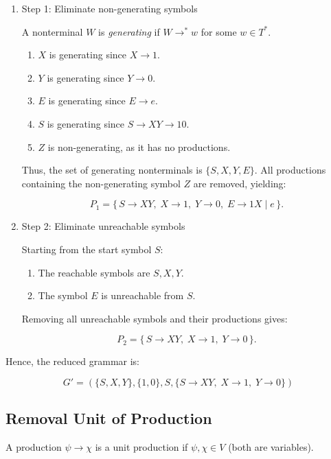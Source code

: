 \documentclass[12pt,a4paper,openany]{article}
\begin{document}
\begin{enumerate}

\item Step 1: Eliminate non-generating symbols

A nonterminal \(W\) is \emph{generating} if \(W \to^* w\) for some \(w \in T^*\).

\begin{enumerate}
    \item \(X\) is generating since \(X \to 1\).
    \item \(Y\) is generating since \(Y \to 0\).
    \item \(E\) is generating since \(E \to e\).
    \item \(S\) is generating since \(S \to XY \to 10\).
    \item \(Z\) is non-generating, as it has no productions.
\end{enumerate}

Thus, the set of generating nonterminals is \(\{S, X, Y, E\}\).
All productions containing the non-generating symbol \(Z\) are removed, yielding:

\[
P_1 = \{\, S \to XY,\; X \to 1,\; Y \to 0,\; E \to 1X \mid e \,\}.
\]

\item Step 2: Eliminate unreachable symbols

Starting from the start symbol \(S\):

\begin{enumerate}
    \item The reachable symbols are \(S, X, Y\).
    \item The symbol \(E\) is unreachable from \(S\).
\end{enumerate}

Removing all unreachable symbols and their productions gives:

\[
P_2 = \{\, S \to XY,\; X \to 1,\; Y \to 0 \,\}.
\]

\end{enumerate}

Hence, the reduced grammar is:

\[\boxed{G' = (\{S, X, Y\}, \{1, 0\}, S, \{S \to XY,\; X \to 1,\; Y \to 0\})}\]

\subsection{Removal Unit of Production}

A production $\psi \to \chi$ is a unit production if $\psi, \chi \in V$ (both are variables).
\end{document}
